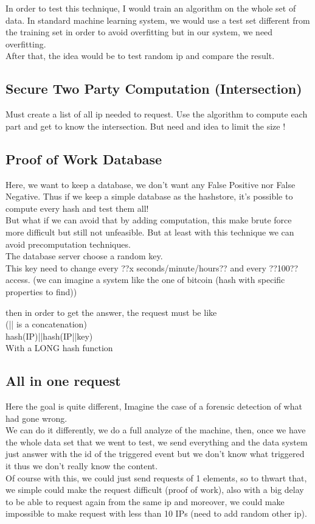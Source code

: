 \documentclass{eplmastersthesis}
\begin{document}
In order to test this technique, I would train an algorithm on the whole set of data. In standard machine learning system, we would use a test set different from the training set in order to avoid overfitting but in our system, we need overfitting. \\
After that, the idea would be to test random  ip and compare the result.

\subsection{Secure Two Party Computation (Intersection)}
Must create a list of all ip needed to request.
Use the algorithm to compute each part and get to know the intersection.
But need and idea to limit the size ! 

\subsection{Proof of Work Database}
Here, we want to keep a database, we don't want any False Positive nor False Negative. Thus if we keep a simple database as the hashstore, it's possible to compute every hash and test them all!\\
But what if we can avoid that by adding computation, this make brute force more difficult but still not unfeasible. But at least with this technique we can avoid precomputation techniques.\\

The database server choose a random key.\\
This key need to change every ??x seconds/minute/hours?? and every ??100?? access.
(we can imagine a system like the one of bitcoin (hash with specific properties to find))

then in order to get the answer, the request must be like\\
(|| is a concatenation)\\
hash(IP)||hash(IP||key)\\
With a LONG hash function

\subsection{All in one request}
Here the goal is quite different, Imagine the case of a forensic detection of what had gone wrong.\\
We can do it differently, we do a full analyze of the machine, then, once we have the whole data set that we went to test, we send everything and the data system just answer with the id of the triggered event but we don't know what triggered it thus we don't really know the content.\\
Of course with this, we could just send requests of 1 elements, so to thwart that, we simple could make the request difficult (proof of work), also with a big delay to be able to request again from the same ip and moreover, we could make impossible to make request with less than 10 IPs (need to add random other ip).
\end{document}

